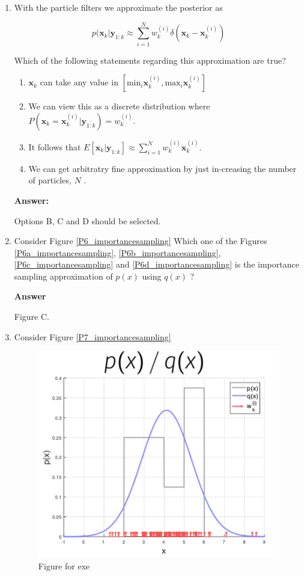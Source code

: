 \begin{enumerate}
\item With the particle filters we approximate the posterior as 

\begin{equation}
p(\mathbf{x}_k | \mathbf{y}_{1:k} \approx \sum_{i=1}^{N} w_{k}^{(i)}\delta(\mathbf{x}_k - \mathbf{x}_{k}^{(i)})
\end{equation}

 Which of the following statements regarding this approximation are true?

\begin{enumerate}
\item $\mathbf{x}_k$ can take any value in $[\text{min}_i \mathbf{x}_{k}^{(i)},\text{max}_i \mathbf{x}_{k}^{(i)}]$
\item We can view this as a discrete distribution where $P(\mathbf{x}_{k} = \mathbf{x}_{k}^{(i)} | \mathbf{y}_{1:k}) = w_{k}^{(i)}$.
\item It follows that  $E[\mathbf{x}_{k} | \mathbf{y}_{1:k}] \approx \sum_{i=1}^{N} w_{k}^{(i)}\mathbf{x}_{k}^{(i)}$.
\item We can get arbitratry fine approximation by just in-creasing the number of particles, $N$ . 
\end{enumerate}

\textbf{Answer:}

Options B, C and D should be selected.

\item Consider Figure \ref{P6_importancesampling}
Which one of the Figures \ref{P6a_importancesampling}, \ref{P6b_importancesampling}, \ref{P6c_importancesampling} and \ref{P6d_importancesampling} is the importance sampling approximation of $p(x)$ using $q(x)$ ?

\textbf{Answer}

Figure C.

\item Consider Figure \ref{P7_importancesampling}
\begin{figure}[!htb]
\begin{center}
\includegraphics[scale=0.320]{img/particle_filters/P7_importancesampling.png}
\end{center}
\caption{Figure for exe}
\end{figure}


\end{enumerate}
